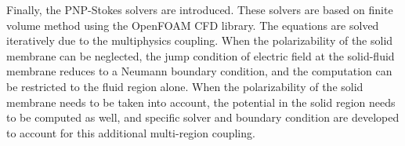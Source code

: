 
Finally, the PNP-Stokes solvers are introduced. These solvers are based on finite volume method using the OpenFOAM CFD library. The equations are solved iteratively due to the multiphysics coupling. When the polarizability of the solid membrane can be neglected, the jump condition of electric field at the solid-fluid membrane reduces to a Neumann boundary condition, and the computation can be restricted to the fluid region alone. When the polarizability of the solid membrane needs to be taken into account, the potential in the solid region needs to be computed as well, and specific solver and boundary condition are developed to account for this additional multi-region coupling.